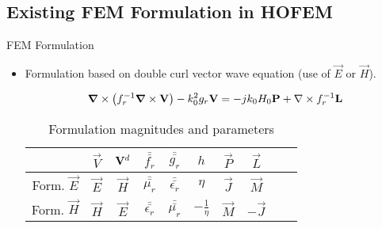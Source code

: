%
%

\subsection{Existing FEM Formulation in HOFEM}

\begin{frame}[allowframebreaks]{FEM Formulation}

  \begin{itemize}\setlength{\itemsep}{0.3\baselineskip}
  \item Formulation based on double curl vector wave equation (use of
    $\vec{E}$ \alert{or} $\vec{H}$).

    \begin{equation*}
    \boldsymbol{\nabla}\times \left(f_r^{-1} \boldsymbol{\nabla}\times  \mathbf{V}\right)-
    k_0^2 g_r \mathbf{V}=
    -j k_0 H_0 \mathbf{P} + \nabla\times f_r^{-1}\mathbf{L}
    \end{equation*}  


    \begin{table}[tb]
      \renewcommand{\arraystretch}{1.3}
      \caption{Formulation magnitudes and parameters}
      \label{table::formulation}
      \centering
      \begin{tabular}{c|ccccccccc}
        & $\vec{V}$ & $\mathbf{V}^d$ & ${\bar{\bar{f_r}}}$
        & ${\bar{\bar{g_r}}}$ & $h$
        & $\vec{P}$ & $\vec{L}$
        \\
        \hline
        Form. $\vec{E}$ &  $\vec{E}$ & $\vec{H}$ & ${\bar{\bar{\mu_r}}}$ 
        & ${\bar{\bar{\epsilon_r}}}$ & $\eta$ & $\vec{J}$ & $\vec{M}$
        \\
        Form. $\vec{H}$ &  $\vec{H}$ & $\vec{E}$ & ${\bar{\bar{\epsilon_r}}}$ 
        & ${\bar{\bar{\mu_r}}}$ & $-\frac{1}{\eta}$ & $\vec{M}$ & $-\vec{J}$
        \\
      \end{tabular}
      

\end{table}
\end{itemize}
\end{frame}
